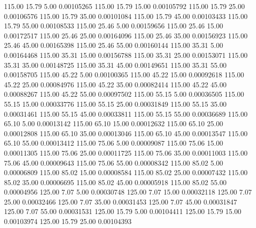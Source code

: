     115.00     15.79      5.00     0.00105265
    115.00     15.79     15.00     0.00105792
    115.00     15.79     25.00     0.00106576
    115.00     15.79     35.00     0.00101084
    115.00     15.79     45.00     0.00103433
    115.00     15.79     55.00     0.00108533
    115.00     25.46      5.00     0.00159656
    115.00     25.46     15.00     0.00172517
    115.00     25.46     25.00     0.00164096
    115.00     25.46     35.00     0.00156923
    115.00     25.46     45.00     0.00165398
    115.00     25.46     55.00     0.00160144
    115.00     35.31      5.00     0.00164468
    115.00     35.31     15.00     0.00156788
    115.00     35.31     25.00     0.00153071
    115.00     35.31     35.00     0.00148725
    115.00     35.31     45.00     0.00149651
    115.00     35.31     55.00     0.00158705
    115.00     45.22      5.00     0.00100365
    115.00     45.22     15.00     0.00092618
    115.00     45.22     25.00     0.00084976
    115.00     45.22     35.00     0.00082414
    115.00     45.22     45.00     0.00088267
    115.00     45.22     55.00     0.00097502
    115.00     55.15      5.00     0.00036505
    115.00     55.15     15.00     0.00033776
    115.00     55.15     25.00     0.00031849
    115.00     55.15     35.00     0.00031461
    115.00     55.15     45.00     0.00033811
    115.00     55.15     55.00     0.00036689
    115.00     65.10      5.00     0.00013142
    115.00     65.10     15.00     0.00012632
    115.00     65.10     25.00     0.00012808
    115.00     65.10     35.00     0.00013046
    115.00     65.10     45.00     0.00013547
    115.00     65.10     55.00     0.00013412
    115.00     75.06      5.00     0.00009087
    115.00     75.06     15.00     0.00011305
    115.00     75.06     25.00     0.00011725
    115.00     75.06     35.00     0.00011003
    115.00     75.06     45.00     0.00009643
    115.00     75.06     55.00     0.00008342
    115.00     85.02      5.00     0.00006809
    115.00     85.02     15.00     0.00008584
    115.00     85.02     25.00     0.00007432
    115.00     85.02     35.00     0.00006695
    115.00     85.02     45.00     0.00005918
    115.00     85.02     55.00     0.00004956
    125.00      7.07      5.00     0.00030748
    125.00      7.07     15.00     0.00032118
    125.00      7.07     25.00     0.00032466
    125.00      7.07     35.00     0.00031453
    125.00      7.07     45.00     0.00031847
    125.00      7.07     55.00     0.00031531
    125.00     15.79      5.00     0.00104411
    125.00     15.79     15.00     0.00103974
    125.00     15.79     25.00     0.00104393
